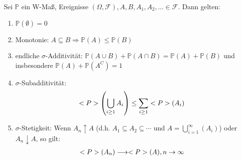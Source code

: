 \begin{proposition}
	Sei $\mathbb{P}$ ein W-Maß, Ereignisse $(\Omega, \mathscr{F}), A, B, A_1, A_2, \dots \in \mathscr{F}$. Dann gelten:
	\begin{enumerate}
		\item $\mathbb{P}(\emptyset) = 0$
		\item Monotonie: $A \subseteq B \Rightarrow \mathbb{P}(A) \le \mathbb{P}(B)$
		\item endliche $\sigma$-Additivität: $\mathbb{P}(A\cup B) + \mathbb{P}(A\cap B) = \mathbb{P}(A) + \mathbb{P}(B)$ und insbesondere $\mathbb{P}(A) + \mathbb{P}(A^C) = 1$
		\item $\sigma$-Subadditivität:
		\begin{align}
			\mathbb{P}\left(\bigcup_{i \ge 1} A_i\right) \le \sum_{i \ge 1} \mathbb{P}(A_i)\notag
		\end{align}
		\item $\sigma$-Stetigkeit: Wenn $A_n \uparrow A$ (d.h. $A_1 \subseteq A_2 \subseteq \cdots$ und $A = \bigcup_{i=1}^{\infty} (A_i)$) oder $A_n \downarrow A$, so gilt:
		\begin{align}
			\mathbb{P}(A_n) \longrightarrow \mathbb{P}(A), n \to \infty \notag
		\end{align}
	\end{enumerate}
\end{proposition}


